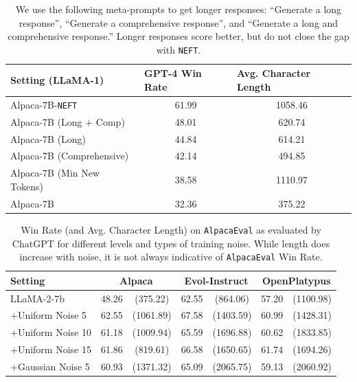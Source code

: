 \documentclass{article} %
\newcommand{\neft}{\texttt{NEFT}}
\newcommand{\llama}{LLaMA}
\begin{document}
\begin{table}[h]
\centering
\caption{We use the following meta-prompts to get longer responses: ``Generate a long response'', ``Generate a comprehensive response'', and ``Generate a long and comprehensive response.'' Longer responses score better, but do not close the gap with \neft{}.}\label{tab:prompt_length_ablation}
\begin{tabular}{lcc} \toprule
Setting (\llama{}-1)                    & \multicolumn{1}{l}{GPT-4 Win Rate} & \multicolumn{1}{l}{Avg. Character Length} \\ \midrule
Alpaca-7B-\neft{} & 61.99                              & 1058.46                            \\
Alpaca-7B (Long + Comp)      & 48.01                              & 620.74                             \\
Alpaca-7B (Long)           & 44.84                              & 614.21                             \\
Alpaca-7B (Comprehensive)    & 42.14                              & 494.85                             \\
Alpaca-7B (Min New Tokens)    & 38.58                              & 1110.97                            \\
Alpaca-7B                   & 32.36                              & 375.22 \\ \bottomrule  
\end{tabular}
\end{table}

\begin{table}[h]
\centering
\caption{ Win Rate (and Avg. Character Length) on \texttt{AlpacaEval} as evaluated by ChatGPT for different levels and types of training noise. While length does increase with noise, it is not always indicative of \texttt{AlpacaEval} Win Rate.}\label{tab:Noise_Length_Ablation}
\begin{tabular}{lcccccc} \toprule
Setting   & \multicolumn{2}{c}{Alpaca} &  \multicolumn{2}{c}{Evol-Instruct}   & \multicolumn{2}{c}{OpenPlatypus}     \\ \midrule
\llama{}-2-7b        & 48.26 & (375.22) & 62.55& (864.06)  & 57.20 & (1100.98) \\ \midrule
+Uniform Noise 5  & 62.55& (1061.89)   & 67.58 & (1403.59) & 60.99& (1428.31) \\\midrule
+Uniform Noise 10 & 61.18 & (1009.94)    & 65.59 & (1696.88) & 60.62 & (1833.85)  \\\midrule
+Uniform Noise 15 & 61.86 & (819.61)    & 66.58 & (1650.65) & 61.74 & (1694.26) \\\midrule
+Gaussian Noise 5 & 60.93 & (1371.32)    & 65.09 & (2065.75) & 59.13 & (2060.92) \\ \bottomrule
\end{tabular}
\end{table}
\end{document}
